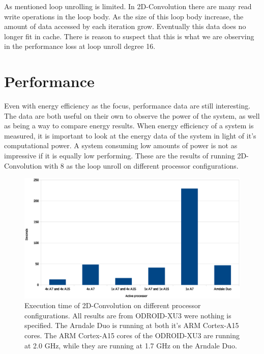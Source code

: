 As mentioned loop unrolling is limited.
In 2D-Convolution there are many read write operations in the loop body.
As the size of this loop body increase, the amount of data accessed by each iteration grow.
Eventually this data does no longer fit in cache.
There is reason to suspect that this is what we are observing in the performance loss at loop unroll degree 16.

\section{Performance}
Even with energy efficiency as the focus, performance data are still interesting.
The data are both useful on their own to observe the power of the system, as well as being a way to compare energy results.
When energy efficiency of a system is measured, it is important to look at the energy data of the system in light of it's computational power.
A system consuming low amounts of power is not as impressive if it is equally low performing.
These are the results of running 2D-Convolution with 8 as the loop unroll on different processor configurations.

\begin{figure}[H]
  \centering
  \includegraphics[width=160mm]{fig/execution-time-configurations.eps}
  \caption{Execution time of 2D-Convolution on different processor configurations. All results are from ODROID-XU3 were nothing is specified. The Arndale Duo is running at both it's ARM Cortex-A15 cores. The ARM Cortex-A15 cores of the ODROID-XU3 are running at 2.0 GHz, while they are running at 1.7 GHz on the Arndale Duo. \label{overflow}}
\end{figure}

